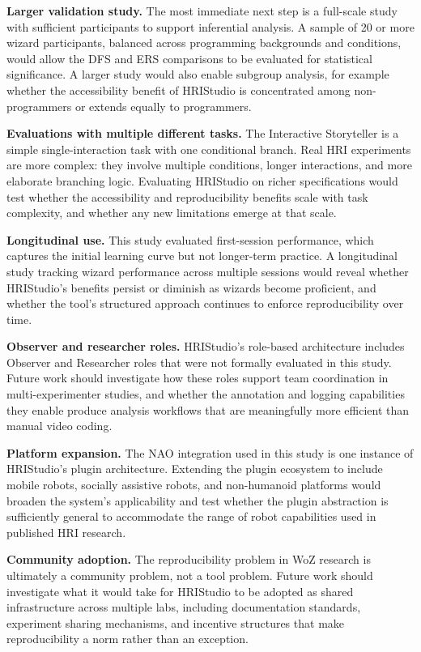 \textbf{Larger validation study.} The most immediate next step is a full-scale study with sufficient participants to support inferential analysis. A sample of 20 or more wizard participants, balanced across programming backgrounds and conditions, would allow the DFS and ERS comparisons to be evaluated for statistical significance. A larger study would also enable subgroup analysis, for example whether the accessibility benefit of HRIStudio is concentrated among non-programmers or extends equally to programmers.

\textbf{Evaluations with multiple different tasks.} The Interactive Storyteller is a simple single-interaction task with one conditional branch. Real HRI experiments are more complex: they involve multiple conditions, longer interactions, and more elaborate branching logic. Evaluating HRIStudio on richer specifications would test whether the accessibility and reproducibility benefits scale with task complexity, and whether any new limitations emerge at that scale.

\textbf{Longitudinal use.} This study evaluated first-session performance, which captures the initial learning curve but not longer-term practice. A longitudinal study tracking wizard performance across multiple sessions would reveal whether HRIStudio's benefits persist or diminish as wizards become proficient, and whether the tool's structured approach continues to enforce reproducibility over time.

\textbf{Observer and researcher roles.} HRIStudio's role-based architecture includes Observer and Researcher roles that were not formally evaluated in this study. Future work should investigate how these roles support team coordination in multi-experimenter studies, and whether the annotation and logging capabilities they enable produce analysis workflows that are meaningfully more efficient than manual video coding.

\textbf{Platform expansion.} The NAO integration used in this study is one instance of HRIStudio's plugin architecture. Extending the plugin ecosystem to include mobile robots, socially assistive robots, and non-humanoid platforms would broaden the system's applicability and test whether the plugin abstraction is sufficiently general to accommodate the range of robot capabilities used in published HRI research.

\textbf{Community adoption.} The reproducibility problem in WoZ research is ultimately a community problem, not a tool problem. Future work should investigate what it would take for HRIStudio to be adopted as shared infrastructure across multiple labs, including documentation standards, experiment sharing mechanisms, and incentive structures that make reproducibility a norm rather than an exception.

